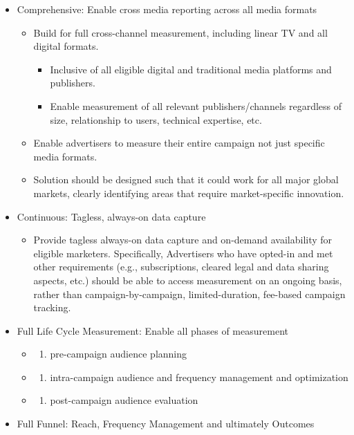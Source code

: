 \documentclass[]{article}
\providecommand{\tightlist}{%
  \setlength{\itemsep}{0pt}\setlength{\parskip}{0pt}}
\begin{document}
\begin{itemize}
\item
  Comprehensive: Enable cross media reporting across all media formats

  \begin{itemize}
  \tightlist
  \item Build for full cross-channel measurement, including linear TV and all digital formats.
    \begin{itemize}
    \tightlist
    \item Inclusive of all eligible digital and traditional media platforms and publishers.
    \item Enable measurement of all relevant publishers/channels regardless of size, relationship to users, technical expertise, etc.
    \end{itemize}
  \item Enable advertisers to measure their entire campaign not just specific media formats.
  \item Solution should be designed such that it could work for all major global markets, clearly identifying areas that require market-specific innovation.
  \end{itemize}
\item Continuous: Tagless, always-on data capture

  \begin{itemize}
  \tightlist
  \item Provide tagless always-on data capture and on-demand availability for eligible marketers. Specifically, Advertisers who have opted-in and met other requirements (e.g., subscriptions, cleared legal and data sharing aspects, etc.) should be able to access measurement on an ongoing basis, rather than campaign-by-campaign, limited-duration, fee-based campaign tracking.
  \end{itemize}
\item Full Life Cycle Measurement: Enable all phases of measurement

  \begin{itemize}
  \item
    \begin{enumerate}
    \def\labelenumi{(\arabic{enumi})}
    \tightlist
    \item
      pre-campaign audience planning
    \end{enumerate}
  \item
    \begin{enumerate}
    \def\labelenumi{(\arabic{enumi})}
    \setcounter{enumi}{1}
    \tightlist
    \item
      intra-campaign audience and frequency management and optimization
    \end{enumerate}
  \item
    \begin{enumerate}
    \def\labelenumi{(\arabic{enumi})}
    \setcounter{enumi}{2}
    \tightlist
    \item
      post-campaign audience evaluation
    \end{enumerate}
  \end{itemize}
\item
  Full Funnel: Reach, Frequency Management and ultimately Outcomes


\end{itemize}
\end{document}
